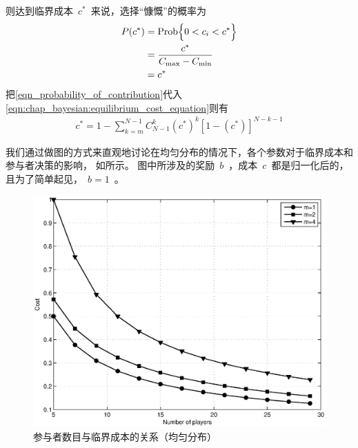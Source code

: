 则达到临界成本~$c^*$~来说，选择“慷慨”的概率为
\begin{align} 
    P(c^*) &= \text{Prob} \Bigl\{ 0 < c_i < c^*\Bigr\} \notag\\ 
    &= \frac{c^*}{C_{\max}-C_{\min}} \notag\\
    &= c^* 
    \label{eqn_probability_of_contribution} 
\end{align}
把\eqref{eqn_probability_of_contribution}代入\eqref{eqn:chap_bayesian:equilibrium_cost_equation}则有
\begin{align*} 
    c^* = 1- \sum_{k=m}^{N-1}C_{N-1}^k (c^*)^k [1-(c^*)]^{N-k-1}
\end{align*}

我们通过做图的方式来直观地讨论在均匀分布的情况下，各个参数对于临界成本和参与者决策的影响，
如所示。
图中所涉及的奖励~$b$~，成本~$c$~都是归一化后的，且为了简单起见，~$b = 1$~。
\begin{figure}[tb]
\begin{centering}
\includegraphics[scale=0.5]{bayesian_uniform_user_number_vs_contribute_probability.eps}
\caption{参与者数目与临界成本的关系（均匀分布）}
\label{fig:bayesian_user_numb_vs_contr_prob}
\end{centering}
\end{figure}
